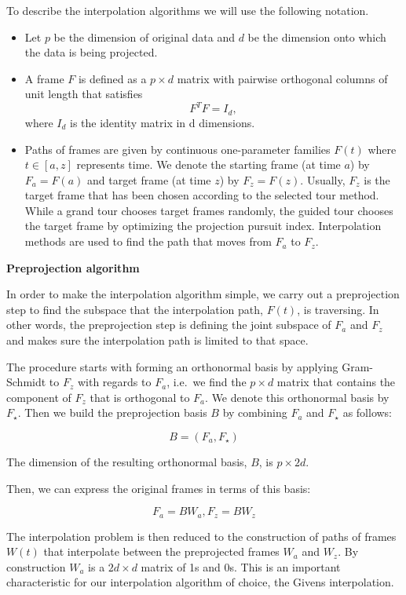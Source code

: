 To describe the interpolation algorithms we will use the following
notation.

\begin{itemize}
\item
  Let \(p\) be the dimension of original data and \(d\) be the dimension
  onto which the data is being projected.
\item
  A frame \(F\) is defined as a \(p\times d\) matrix with pairwise
  orthogonal columns of unit length that satisfies \[F^TF = I_d,\] where
  \(I_d\) is the identity matrix in d dimensions.
\item
  Paths of frames are given by continuous one-parameter families
  \(F(t)\) where \(t\in [a, z]\) represents time. We denote the starting
  frame (at time \(a\)) by \(F_a = F(a)\) and target frame (at time
  \(z\)) by \(F_z = F(z)\). Usually, \(F_z\) is the target frame that
  has been chosen according to the selected tour method. While a grand
  tour chooses target frames randomly, the guided tour chooses the
  target frame by optimizing the projection pursuit index. Interpolation
  methods are used to find the path that moves from \(F_a\) to \(F_z\).
\end{itemize}

\textbf{Preprojection algorithm}

In order to make the interpolation algorithm simple, we carry out a
preprojection step to find the subspace that the interpolation path,
\(F(t)\), is traversing. In other words, the preprojection step is
defining the joint subspace of \(F_a\) and \(F_z\) and makes sure the
interpolation path is limited to that space.

The procedure starts with forming an orthonormal basis by applying
Gram-Schmidt to \(F_z\) with regards to \(F_a\), i.e.~we find the
\(p\times d\) matrix that contains the component of \(F_z\) that is
orthogonal to \(F_a\). We denote this orthonormal basis by \(F_\star\).
Then we build the preprojection basis \(B\) by combining \(F_a\) and
\(F_\star\) as follows:

\[B = (F_a, F_{\star})\]

The dimension of the resulting orthonormal basis, \(B\), is
\(p\times 2d\).

Then, we can express the original frames in terms of this basis:

\[F_a = B W_a, F_z = B W_z\]

The interpolation problem is then reduced to the construction of paths
of frames \(W(t)\) that interpolate between the preprojected frames
\(W_a\) and \(W_z\). By construction \(W_a\) is a \(2d\times d\) matrix
of 1s and 0s. This is an important characteristic for our interpolation
algorithm of choice, the Givens interpolation.

